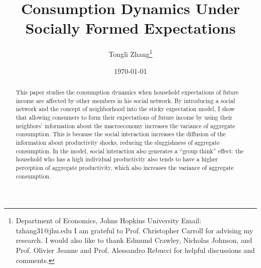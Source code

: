 \documentclass[12pt,letterpaper]{article}
\begin{document}
\title{Consumption Dynamics Under Socially Formed Expectations}
\author{Tongli Zhang\thanks{Department of Economics, Johns Hopkins University\newline \hspace*{1.5em} Email: tzhang31@jhu.edu\newline \hspace*{1.5em} I am grateful to Prof. Christopher Carroll for advising my research. I would also like to thank Edmund Crawley, Nicholas Johnson, and Prof. Olivier Jeanne and Prof. Alessandro Rebucci for helpful discussions and comments.}}
\date{\today}

\maketitle
\begin{abstract}
	This paper studies the consumption dynamics when household expectations of future income are affected by other members in his social network. By introducing a social network and the concept of neighborhood into the sticky expectation model, I show that allowing consumers to form their expectations of future income by using their neighbors' information about the macroeconomy increases the variance of aggregate consumption. This is because the social interaction increases the diffusion of the information about productivity shocks, reducing the sluggishness of aggregate consumption. In the model, social interaction also generates a ``group think'' effect: the household who has a high individual productivity also tends to have a higher perception of aggregate productivity, which also increases the variance of aggregate consumption.
\end{abstract}
\end{document}
